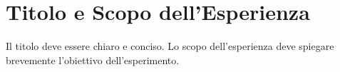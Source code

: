 \section{Titolo e Scopo dell'Esperienza}
Il titolo deve essere chiaro e conciso. Lo scopo dell'esperienza deve spiegare brevemente l'obiettivo dell'esperimento.


